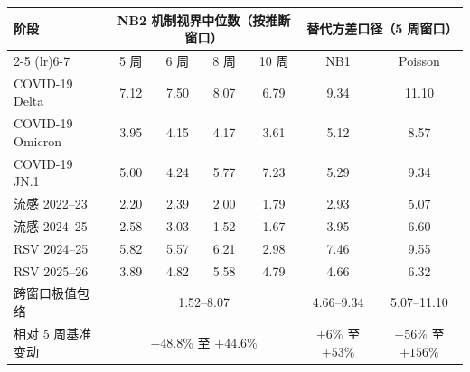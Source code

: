 \begin{tabular}{lcccccc}
\toprule
\multirow{2}{*}{阶段} & \multicolumn{4}{c}{NB2 机制视界中位数（按推断窗口）} & \multicolumn{2}{c}{替代方差口径（5 周窗口）} \\
\cmidrule(lr){2-5} \cmidrule(lr){6-7}
& 5 周 & 6 周 & 8 周 & 10 周 & NB1 & Poisson \\
\midrule
COVID-19 Delta & 7.12 & 7.50 & 8.07 & 6.79 & 9.34 & 11.10 \\
COVID-19 Omicron & 3.95 & 4.15 & 4.17 & 3.61 & 5.12 & 8.57 \\
COVID-19 JN.1 & 5.00 & 4.24 & 5.77 & 7.23 & 5.29 & 9.34 \\
流感 2022--23 & 2.20 & 2.39 & 2.00 & 1.79 & 2.93 & 5.07 \\
流感 2024--25 & 2.58 & 3.03 & 1.52 & 1.67 & 3.95 & 6.60 \\
RSV 2024--25 & 5.82 & 5.57 & 6.21 & 2.98 & 7.46 & 9.55 \\
RSV 2025--26 & 3.89 & 4.82 & 5.58 & 4.79 & 4.66 & 6.32 \\
\midrule
跨窗口极值包络 & \multicolumn{4}{c}{1.52--8.07} & 4.66--9.34 & 5.07--11.10 \\
相对 5 周基准变动 & \multicolumn{4}{c}{$-48.8\%$ 至 $+44.6\%$} & $+6\%$ 至 $+53\%$ & $+56\%$ 至 $+156\%$ \\
\bottomrule
\end{tabular}